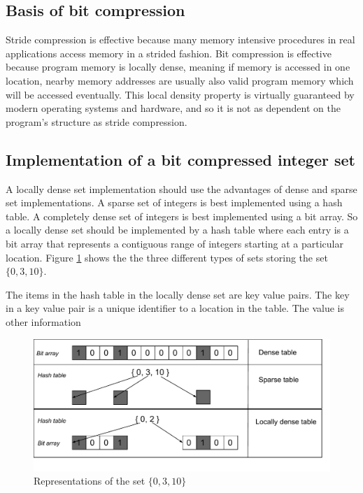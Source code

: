 \documentclass[12pt,twoside]{reedthesis}
\begin{document}
		\subsection{Basis of bit compression}
		
		Stride compression is effective because many memory intensive procedures in real applications access memory in a strided fashion. Bit compression is effective because program memory is locally dense, meaning if memory is accessed in one location, nearby memory addresses are usually also valid program memory which will be accessed eventually. This local density property is virtually guaranteed by modern operating systems and hardware, and so it is not as dependent on the program's structure as stride compression. 
		
		\subsection{Implementation of a bit compressed integer set}
		\label{s:bit-set-comp-impl}
		
		A locally dense set implementation should use the advantages of dense and sparse set implementations. 
		A sparse set of integers is best implemented using a hash table. A completely dense set of integers is best implemented using a bit array. So a locally dense set should be implemented by a hash table where each entry is a bit array that represents a contiguous range of integers starting at a particular location. Figure \ref{fig:bit-local-density} shows the the three different types of sets storing the set $\{0, 3, 10\}$. 
		
		The items in the hash table in the locally dense set are key value pairs. The key in a key value pair is a unique identifier to a location in the table. The value is other information 
		
		\begin{figure}[H]
			\caption{Representations of the set $\{0, 3, 10\}$}
			\label{fig:bit-local-density}
			\includegraphics[scale=0.8]{BitSetComparison.pdf}
		\end{figure}
		
\end{document}
